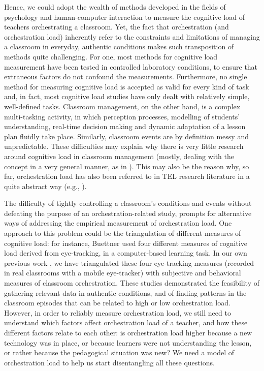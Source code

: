 \documentclass[10pt,journal,compsoc]{IEEEtran}
\begin{document}
Hence, we could adopt the wealth of methods developed in the fields of psychology and human-computer interaction to measure the cognitive load of teachers orchestrating a classroom. Yet, the fact that orchestration (and orchestration load) inherently refer to the constraints and limitations of managing a classroom in everyday, authentic conditions \cite{Roschelle2013} makes such transposition of methods quite challenging. For one, most methods for cognitive load measurement have been tested in controlled laboratory conditions, to ensure that extraneous factors do not confound the measurements. Furthermore, no single method for measuring cognitive load is accepted as valid for every kind of task \cite{boucsein2000engineering} and, in fact, most cognitive load studies have only dealt with relatively simple, well-defined tasks. Classroom management, on the other hand, is a complex multi-tasking activity, in which perception processes, modelling of students' understanding, real-time decision making and dynamic adaptation of a lesson plan fluidly take place. Similarly, classroom events are by definition messy and unpredictable. These difficulties may explain why there is very little research around cognitive load in classroom management (mostly, dealing with the concept in a very general manner, as in \cite{feldon2007cognitive}). This may also be the reason why, so far, orchestration load has also been referred to in TEL research literature in a quite abstract way (e.g., \cite{Cuendet2013, munoz2013sharing}).

The difficulty of tightly controlling a classroom's conditions and events without defeating the purpose of an orchestration-related study, prompts for alternative ways of addressing the empirical measurement of orchestration load. One approach to this problem could be the triangulation of different measures of cognitive load: for instance, Buettner \cite{Buettner2013} used four different measures of cognitive load derived from eye-tracking, in a computer-based learning task. In our own previous work \cite{Prieto2015ectel}, we have triangulated these four eye-tracking measures (recorded in real classrooms with a mobile eye-tracker) with subjective and behavioral measures of classroom orchestration. These studies demonstrated the feasibility of gathering relevant data in authentic conditions, and of finding patterns in the classroom episodes that can be related to high or low orchestration load. However, in order to reliably measure orchestration load, we still need to understand which factors affect orchestration load of a teacher, and how these different factors relate to each other: is orchestration load higher because a new technology was in place, or because learners were not understanding the lesson, or rather because the pedagogical situation was new? We need a model of orchestration load to help us start disentangling all these questions.
\end{document}
